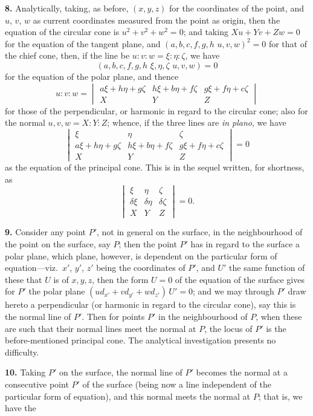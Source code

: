 \documentclass[11pt,a4paper]{article}
\theoremstyle{plain}
\begin{document}
\textbf{8.} Analytically, taking, as before, $(x, y, z)$ for the coordinates of the point, and
$u$, $v$, $w$ as current coordinates measured from the point as origin, then the equation
of the circular cone is $u^2 + v^2 + w^2 = 0$; and taking $Xu + Yv + Zw = 0$ for the equation
of the tangent plane, and $(a, b, c, f, g, h\,\,u, v, w)^2 = 0$ for that of the chief cone, then,
if the line be $u : v : w = \xi : \eta : \zeta$, we have
\[
(a, b, c, f, g, h\,\,\xi, \eta, \zeta\,\,u, v, w) = 0
\]
for the equation of the polar plane, and thence
\[
u : v : w = \begin{vmatrix} a\xi + h\eta + g\zeta & h\xi + b\eta + f\zeta & g\xi + f\eta + c\zeta \\ X & Y & Z \end{vmatrix}
\]
for those of the perpendicular, or harmonic in regard to the circular cone; also for the
normal $u, v, w = X : Y : Z$; whence, if the three lines are \textit{in plano}, we have
\[
\begin{vmatrix}
\xi & \eta & \zeta \\
a\xi + h\eta + g\zeta & h\xi + b\eta + f\zeta & g\xi + f\eta + c\zeta \\
X & Y & Z
\end{vmatrix} = 0
\]
as the equation of the principal cone.  This is in the sequel written, for shortness, as
\[
\begin{vmatrix}
\xi & \eta & \zeta \\
\delta\xi & \delta\eta & \delta\zeta \\
X & Y & Z
\end{vmatrix} = 0.
\]

\textbf{9.} Consider any point $P'$, not in general on the surface, in the neighbourhood
of the point on the surface, say $P$; then the point $P'$ has in regard to the surface
a polar plane, which plane, however, is dependent on the particular form of equation---viz.\ $x'$, $y'$, $z'$ being the coordinates of $P'$, and $U'$ the same function of these that
$U$ is of $x, y, z$, then the form $U = 0$ of the equation of the surface gives for $P'$ the
polar plane $(u d_{x'} + v d_{y'} + w d_{z'})\, U' = 0$; and we may through $P'$ draw hereto a perpendicular
(or harmonic in regard to the circular cone), say this is the normal line of
$P'$. Then for points $P'$ in the neighbourhood of $P$, when these are such that their
normal lines meet the normal at $P$, the locus of $P'$ is the before-mentioned principal
cone.  The analytical investigation presents no difficulty.

\textbf{10.} Taking $P'$ on the surface, the normal line of $P'$ becomes the normal at a
consecutive point $P'$ of the surface (being now a line independent of the particular
form of equation), and this normal meets the normal at $P$; that is, we have the
\end{document}
